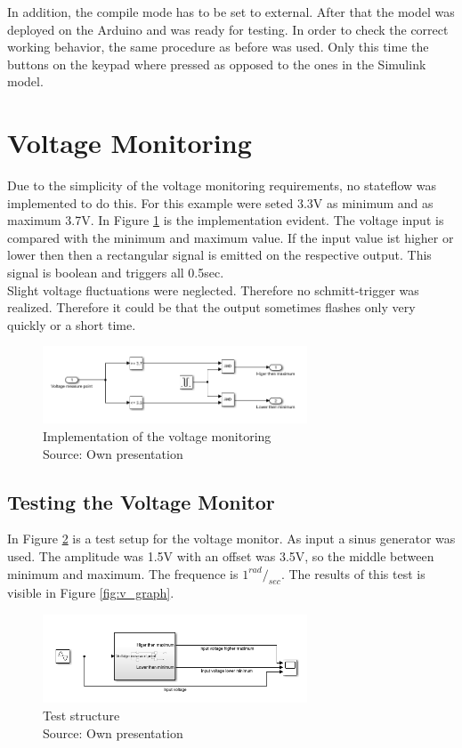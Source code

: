 		In addition, the compile mode has to be set to external. After that the model was deployed on the Arduino and was ready for testing. In order to check the correct working behavior, the same procedure as before was used. Only this time the buttons on the keypad where pressed as opposed to the ones in the Simulink model.

	
	
	\section{Voltage Monitoring}
	Due to the simplicity of the voltage monitoring requirements, no stateflow was implemented to do this. For this example were seted 3.3V as minimum  and as maximum 3.7V. In Figure \ref{fig:v_mon} is the implementation evident. The voltage input is compared with the minimum and maximum value. If the input value ist higher or lower then then a rectangular signal is emitted on the respective output. This signal is boolean and triggers all 0.5sec. \\
	Slight voltage fluctuations were neglected. Therefore no schmitt-trigger was realized. Therefore it could be that the output sometimes flashes only very quickly or a short time. 
		\begin{figure}[H]
			\centering
			\includegraphics[width=0.7\textwidth]{figures/v_monitor.png}
			\caption[Implementation of the voltage monitoring]{Implementation of the voltage monitoring\\ Source: Own presentation}
			\label{fig:v_mon}
		\end{figure}
		\subsection{Testing the Voltage Monitor}
		In Figure \ref*{fig:v_test} is a test setup for the voltage monitor. As input a sinus generator was used. The amplitude was 1.5V with an offset was 3.5V, so the middle between minimum and maximum. The frequence is $1^{rad}/_{sec}.$ The results of this test is visible in Figure \ref{fig:v_graph}.
			\begin{figure}[H]
				\centering
				\includegraphics[width=0.7\textwidth]{figures/v_monitor_testcase.png}
				\caption[Test structure]{Test structure\\ Source: Own presentation}
				\label{fig:v_test}
			\end{figure}
			
